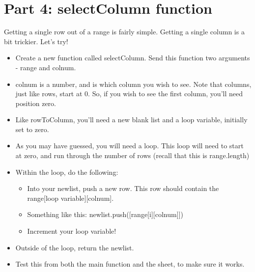 \documentclass{article}
\begin{document}
\section*{Part 4: selectColumn function}
Getting a single row out of a range is fairly simple.  Getting a single column is a bit trickier.  Let's try!
\begin{itemize}
    \item Create a new function called selectColumn.  Send this function two arguments - range and colnum.
    \item colnum is a number, and is which column you wish to see.  Note that columns, just like rows, start at 0. So, if you wish to see the first column, you'll need position zero.
    \item Like rowToColumn, you'll need a new blank list and a loop variable, initially set to zero.
    \item As you may have guessed, you will need a loop.  This loop will need to start at zero, and run through the number of rows (recall that this is range.length)
    \item Within the loop, do the following:
    \begin{itemize}
    		\item Into your newlist, push a new row.  This row should contain the range[loop variable][colnum].
    		\item Something like this:  newlist.push([range[i][colnum]])
    		\item Increment your loop variable!
    	\end{itemize}
    	\item Outside of the loop, return the newlist.
    	\item Test this from both the main function and the sheet, to make sure it works.
\end{itemize}
\end{document}
